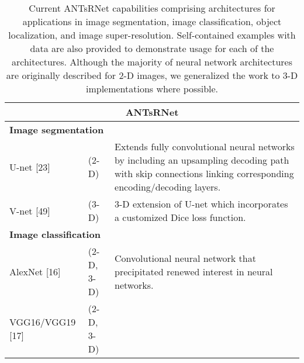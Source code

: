 

\begin{table}[!htb]
\centering
\caption{Current ANTsRNet capabilities comprising architectures for applications in 
image segmentation, image classification, object localization, and image super-resolution.  Self-contained
examples with data are also provided to demonstrate usage for each of the architectures.
Although the majority of neural network architectures are originally described
for 2-D images, we generalized the work to 3-D implementations where possible.}
\label{table:antsrnet}
\begin{tabular*}{\textwidth}{ll@{\extracolsep{\fill}}l}
\toprule
\multicolumn{3}{c}{\textbf{ANTsRNet}}    \\        
\midrule
\multicolumn{3}{l}{\textbf{Image segmentation}}
  \vspace{0.25cm} \\ \vspace{0.2cm} 
  U-net [23] & (2-D) &  %
    \begin{minipage}[t]{0.6\columnwidth}%
        Extends fully convolutional neural networks by 
        including an upsampling decoding path with skip connections 
        linking corresponding encoding/decoding layers. %
    \end{minipage} \\ \vspace{0.3cm} 
  V-net [49] & (3-D) &  %
    \begin{minipage}[t]{0.6\columnwidth}%
        3-D extension of U-net which incorporates a customized
        Dice loss function. %
    \end{minipage} \\
\midrule
\multicolumn{3}{l}{\textbf{Image classification}} 
  \vspace{0.25cm} \\ \vspace{0.2cm} 
  AlexNet [16] & (2-D, 3-D) & %
    \begin{minipage}[t]{0.6\columnwidth}%
        Convolutional neural network that precipitated renewed
        interest in neural networks.
    \end{minipage} \\ \vspace{0.2cm} 
  VGG16/VGG19 [17] & (2-D, 3-D) &    %
    \begin{minipage}[t]{0.6\columnwidth}%

\end{minipage}
\end{tabular*}
\end{table}
